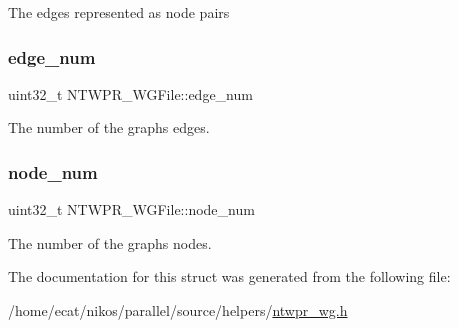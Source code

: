The edges represented as node pairs \mbox{\label{structNTWPR__WGFile_a76b00f9ef8cd1938f7b9ece2db7c686d}} 
\subsubsection{\texorpdfstring{edge\+\_\+num}{edge\_num}}
{\footnotesize\ttfamily uint32\+\_\+t N\+T\+W\+P\+R\+\_\+\+W\+G\+File\+::edge\+\_\+num}

The number of the graph\textquotesingle{}s edges. \mbox{\label{structNTWPR__WGFile_a473237730653419df2494e0f2f52995c}} 
\subsubsection{\texorpdfstring{node\+\_\+num}{node\_num}}
{\footnotesize\ttfamily uint32\+\_\+t N\+T\+W\+P\+R\+\_\+\+W\+G\+File\+::node\+\_\+num}

The number of the graph\textquotesingle{}s nodes. 

The documentation for this struct was generated from the following file\+:\begin{DoxyCompactItemize}
\item 
/home/ecat/nikos/parallel/source/helpers/\mbox{\hyperlink{ntwpr__wg_8h}{ntwpr\+\_\+wg.\+h}}\end{DoxyCompactItemize}
